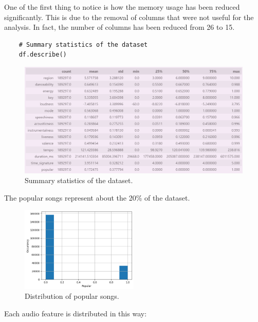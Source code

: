     One of the first thing to notice is how the memory usage has been reduced significantly. This is due to the removal of columns that were not useful for the analysis. In fact, the number of columns has been reduced from 26 to 15.
    
    \newpage
    \begin{verbatim}
    # Summary statistics of the dataset
    df.describe()
    \end{verbatim}
    
    
    \begin{figure}[h]
        \centering
        \includegraphics[width=1.1\textwidth]{media/describe_cleaned.png} 
        \caption{Summary statistics of the dataset.}
        \label{df.describe()}
    \end{figure}

The popular songs represent about the 20\% of the dataset.

    \begin{figure}[h]
        \centering
        \includegraphics[width=0.5\textwidth]{media/popular_dist_cleaned.png} 
        \caption{Distribution of popular songs.}
        \label{popular_songs}
    \end{figure}

\newpage

Each audio feature is distributed in this way: 

